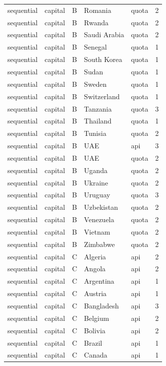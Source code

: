 \begin{tabular}{lllllr}
sequential & capital & B & Romania & quota & 2 \\
sequential & capital & B & Rwanda & quota & 2 \\
sequential & capital & B & Saudi Arabia & quota & 2 \\
sequential & capital & B & Senegal & quota & 1 \\
sequential & capital & B & South Korea & quota & 1 \\
sequential & capital & B & Sudan & quota & 1 \\
sequential & capital & B & Sweden & quota & 1 \\
sequential & capital & B & Switzerland & quota & 1 \\
sequential & capital & B & Tanzania & quota & 3 \\
sequential & capital & B & Thailand & quota & 1 \\
sequential & capital & B & Tunisia & quota & 2 \\
sequential & capital & B & UAE & api & 3 \\
sequential & capital & B & UAE & quota & 2 \\
sequential & capital & B & Uganda & quota & 2 \\
sequential & capital & B & Ukraine & quota & 2 \\
sequential & capital & B & Uruguay & quota & 3 \\
sequential & capital & B & Uzbekistan & quota & 2 \\
sequential & capital & B & Venezuela & quota & 2 \\
sequential & capital & B & Vietnam & quota & 2 \\
sequential & capital & B & Zimbabwe & quota & 2 \\
sequential & capital & C & Algeria & api & 2 \\
sequential & capital & C & Angola & api & 2 \\
sequential & capital & C & Argentina & api & 1 \\
sequential & capital & C & Austria & api & 1 \\
sequential & capital & C & Bangladesh & api & 3 \\
sequential & capital & C & Belgium & api & 2 \\
sequential & capital & C & Bolivia & api & 2 \\
sequential & capital & C & Brazil & api & 1 \\
sequential & capital & C & Canada & api & 1 \\

\end{tabular}

